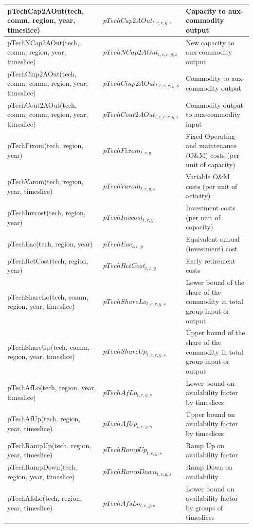 \documentclass{article}
\begin{document}
\begin{longtable}{|p{10cm}|p{5cm}|p{9cm}|}
 \hline
pTechCap2AOut(tech, comm, region, year, timeslice) & $pTechCap2AOut_{t,c,r,y,s}$ & Capacity to aux-commodity output \\
 \hline
pTechNCap2AOut(tech, comm, region, year, timeslice) & $pTechNCap2AOut_{t,c,r,y,s}$ & New capacity to aux-commodity output \\
 \hline
pTechCinp2AOut(tech, comm, comm, region, year, timeslice) & $pTechCinp2AOut_{t,c,c,r,y,s}$ & Commodity to aux-commodity output \\
 \hline
pTechCout2AOut(tech, comm, comm, region, year, timeslice) & $pTechCout2AOut_{t,c,c,r,y,s}$ & Commodity-output to aux-commodity input \\
 \hline
pTechFixom(tech, region, year) & $pTechFixom_{t,r,y}$ & Fixed Operating and maintenance (O\&M) costs (per unit of capacity) \\
 \hline
pTechVarom(tech, region, year, timeslice) & $pTechVarom_{t,r,y,s}$ & Variable O\&M costs (per unit of acticity) \\
 \hline
pTechInvcost(tech, region, year) & $pTechInvcost_{t,r,y}$ & Investment costs (per unit of capacity) \\
 \hline
pTechEac(tech, region, year) & $pTechEac_{t,r,y}$ & Equivalent annual (investment) cost \\
 \hline
pTechRetCost(tech, region, year) & $pTechRetCost_{t,r,y}$ & Early retirement costs \\
 \hline
pTechShareLo(tech, comm, region, year, timeslice) & $pTechShareLo_{t,c,r,y,s}$ & Lower bound of the share of the commodity in total group input or output \\
 \hline
pTechShareUp(tech, comm, region, year, timeslice) & $pTechShareUp_{t,c,r,y,s}$ & Upper bound of the share of the commodity in total group input or output \\
 \hline
pTechAfLo(tech, region, year, timeslice) & $pTechAfLo_{t,r,y,s}$ & Lower bound on availability factor by timeslices \\
 \hline
pTechAfUp(tech, region, year, timeslice) & $pTechAfUp_{t,r,y,s}$ & Upper bound on availability factor by timeslices \\
 \hline
pTechRampUp(tech, region, year, timeslice) & $pTechRampUp_{t,r,y,s}$ & Ramp Up on availability factor \\
 \hline
pTechRampDown(tech, region, year, timeslice) & $pTechRampDown_{t,r,y,s}$ & Ramp Down on availability \\
 \hline
pTechAfsLo(tech, region, year, timeslice) & $pTechAfsLo_{t,r,y,s}$ & Lower bound on availability factor by groups of timeslices \\

\end{longtable}
\end{document}
